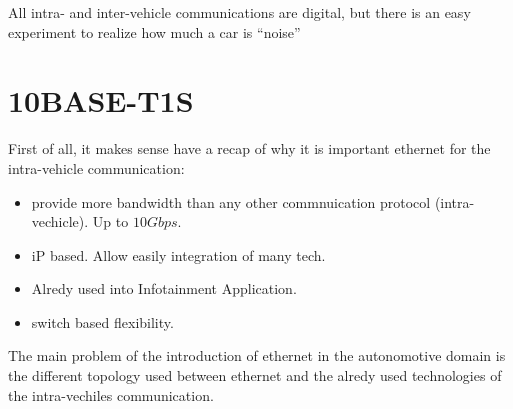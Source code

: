 \begin{boxA}
    All intra- and inter-vehicle communications are digital, but there is an easy experiment to realize how much a car is ``noise''
\end{boxA}

\newpage
\section{10BASE-T1S}
First of all, it makes sense have a recap of why it is important ethernet for the intra-vehicle communication:
\begin{itemize}[nosep]
    \item provide more bandwidth than any other commnuication protocol (intra-vechicle). Up to $10Gbps$.
    \item iP based. Allow easily integration of many tech.
    \item Alredy used into Infotainment Application.
    \item switch based flexibility.
\end{itemize}
The main problem of the introduction of ethernet in the autonomotive domain is the different topology used between ethernet and the alredy used technologies of the intra-vechiles communication.
